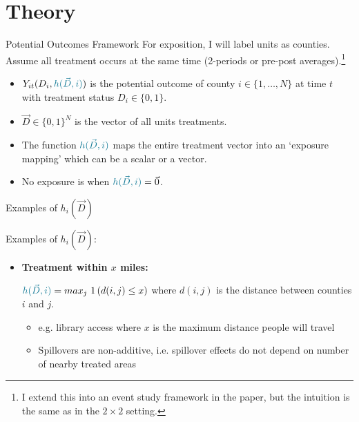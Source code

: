 \documentclass[aspectratio=169,t]{beamer}
\begin{document}
\section{Theory}


\begin{frame}{Potential Outcomes Framework}
    For exposition, I will label units as counties. Assume all treatment occurs at the same time (2-periods or pre-post averages).\footnote{I extend this into an event study framework in the paper, but the intuition is the same as in the $2 \times 2$ setting.}
    
    \begin{itemize}
        \item $Y_{it}(D_i, \textcolor{alice}{h(\vec{D}, i)})$ is the potential outcome of county $i \in \{ 1, \dots, N \}$ at time $t$ with treatment status $D_i \in \{0, 1\}$.
        
        \item $\vec{D} \in \{0,1\}^N$ is the vector of all units treatments.
        
        \pause
        \item The function $\textcolor{alice}{h(\vec{D}, i)}$ maps the entire treatment vector into an `exposure mapping' which can be a scalar or a vector.
        
        \pause
        \item No exposure is when $\textcolor{alice}{h(\vec{D}, i)} = \vec{0}$.
    \end{itemize}
\end{frame}


\begin{frame}{Examples of $h_i(\vec{D})$}
    
    Examples of $h_i(\vec{D})$:
    
    \begin{itemize}
        \item \textbf{Treatment within $x$ miles:}
        
        $\textcolor{alice}{h(\vec{D}, i)} = max_j \ 1\left(d(i, j\right) \leq x)$ where $d(i,j)$ is the distance between counties $i$ and $j$. 

        \begin{itemize}
            \item e.g. library access where $x$ is the maximum distance people will travel
            
            \item Spillovers are non-additive, i.e. spillover effects do not depend on number of nearby treated areas
        \end{itemize}

    \end{itemize}
\end{frame}
\end{document}
